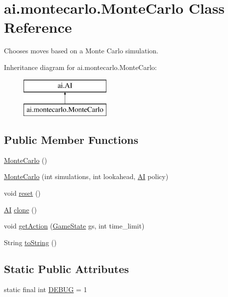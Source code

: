 \hypertarget{classai_1_1montecarlo_1_1_monte_carlo}{
\section{ai.montecarlo.MonteCarlo Class Reference}
\label{classai_1_1montecarlo_1_1_monte_carlo}
}


Chooses moves based on a Monte Carlo simulation.  


Inheritance diagram for ai.montecarlo.MonteCarlo:\begin{figure}[H]
\begin{center}
\leavevmode
\includegraphics[height=2.000000cm]{classai_1_1montecarlo_1_1_monte_carlo}
\end{center}
\end{figure}
\subsection*{Public Member Functions}
\begin{DoxyCompactItemize}
\item 
\hyperlink{classai_1_1montecarlo_1_1_monte_carlo_a46d1baf9d7b1672e21433e074279c81b}{MonteCarlo} ()
\item 
\hyperlink{classai_1_1montecarlo_1_1_monte_carlo_a81d20182d11f7000bb8fb0751d06ca36}{MonteCarlo} (int simulations, int lookahead, \hyperlink{classai_1_1_a_i}{AI} policy)
\item 
void \hyperlink{classai_1_1montecarlo_1_1_monte_carlo_a2b85c686b000c27e810416a7d2bb3ef1}{reset} ()
\item 
\hyperlink{classai_1_1_a_i}{AI} \hyperlink{classai_1_1montecarlo_1_1_monte_carlo_ac82cea968ff3c0edb5d390db1619e462}{clone} ()
\item 
void \hyperlink{classai_1_1montecarlo_1_1_monte_carlo_aec7aa71918a4809e3cdf1ee303a5f030}{getAction} (\hyperlink{classrts_1_1_game_state}{GameState} gs, int time\_\-limit)
\item 
String \hyperlink{classai_1_1montecarlo_1_1_monte_carlo_ac2a0d155e0567d8f5c0e693a6998bede}{toString} ()
\end{DoxyCompactItemize}
\subsection*{Static Public Attributes}
\begin{DoxyCompactItemize}
\item 
static final int \hyperlink{classai_1_1montecarlo_1_1_monte_carlo_a4acd3e92f77f53a3314fd0df91c0d8d6}{DEBUG} = 1
\end{DoxyCompactItemize}
